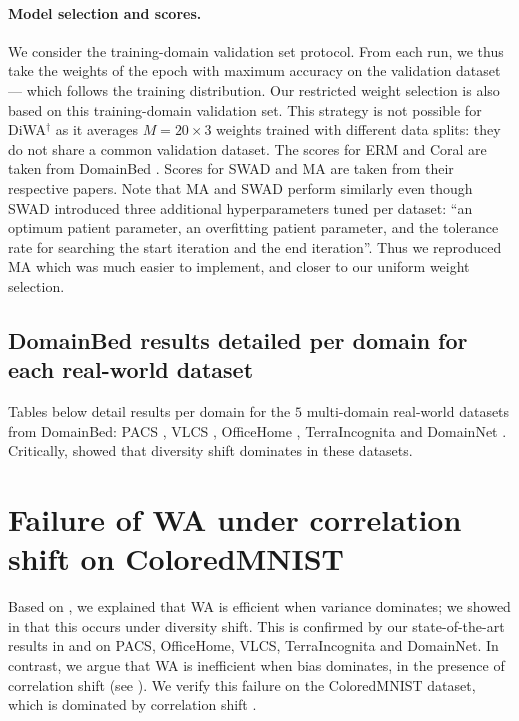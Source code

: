 

\paragraph{Model selection and scores.}
We consider the training-domain validation set protocol.
From each run, we thus take the weights of the epoch with maximum accuracy on the validation dataset --- which follows the training distribution. Our restricted weight selection is also based on this training-domain validation set. This strategy is not possible for DiWA$^\dagger$ as it averages $M=20\times 3$ weights trained with different data splits: they do not share a common validation dataset.
The scores for ERM and Coral are taken from DomainBed \cite{gulrajani2021in}.
Scores for SWAD \cite{cha2021wad} and MA \cite{arpit2021ensemble} are taken from their respective papers.
Note that MA and SWAD perform similarly even though SWAD introduced three additional hyperparameters tuned per dataset: \enquote{an optimum patient parameter, an overfitting patient parameter, and the tolerance rate for searching the start iteration and the end iteration}. Thus we reproduced MA \cite{arpit2021ensemble} which was much easier to implement, and closer to our uniform weight selection.%

\subsection{DomainBed results detailed per domain for each real-world dataset}
\label{app:full_results}

Tables below detail results per domain for the $5$ multi-domain real-world datasets from DomainBed: PACS \cite{li2017deeper}, VLCS \cite{fang2013unbiased}, OfficeHome \cite{venkateswara2017deep}, TerraIncognita \cite{beery2018recognition} and DomainNet \cite{peng2019moment}.
Critically, \cite{ye2021odbench} showed that diversity shift dominates in these datasets.



\FloatBarrier

\section{Failure of WA under correlation shift on ColoredMNIST}
\label{app:failure_corr_shift}
Based on , we explained that WA is efficient when variance dominates; we showed in  that this occurs under diversity shift.
This is confirmed by our state-of-the-art results in  and  on PACS, OfficeHome, VLCS, TerraIncognita and DomainNet.
In contrast, we argue that WA is inefficient when bias dominates, \ie in the presence of correlation shift (see ).
We verify this failure on the ColoredMNIST \cite{arjovsky2019invariant} dataset, which is dominated by correlation shift \cite{peng2019moment}.

